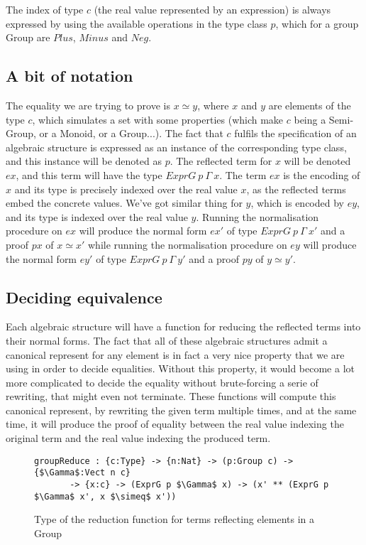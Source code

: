 The index of type $c$ (the real value represented by an expression) is always expressed by using the available operations in the type class $p$, which for a group Group are $Plus$, $Minus$ and $Neg$.

	\subsection {A bit of notation}
The equality we are trying to prove is $x \simeq y$, where $x$ and $y$ are elements of the type $c$, which  simulates a set with some properties (which make $c$ being a Semi-Group, or a Monoid, or a Group...). The fact that $c$ fulfils the specification of an algebraic structure is expressed as an instance of the corresponding type class, and this instance will be denoted as $p$.
The reflected term for $x$ will be denoted $ex$, and this term will have the type $ExprG\ p\ \Gamma\ x$. The term $ex$ is the encoding of $x$ and its type is precisely indexed over the real value $x$, as the reflected terms embed the concrete values.
We've got similar thing for $y$, which is encoded by $ey$, and its type is indexed over the real value $y$.
Running the normalisation procedure on $ex$ will produce the normal form $ex'$ of type $ExprG\ p\ \Gamma\ x'$ and a proof $px$ of $x \simeq x'$ while running the normalisation procedure on $ey$ will produce the normal form $ey'$ of type $ExprG\ p\ \Gamma\ y'$ and a proof $py$ of $y \simeq y'$.

	\subsection {Deciding equivalence}
	
Each algebraic structure will have a function for reducing the reflected terms into their normal forms. The fact that all of these algebraic structures admit a canonical represent for any element is in fact a very nice property that we are using in order to decide equalities. Without this property, it would become a lot more complicated to decide the equality without brute-forcing a serie of rewriting, that might even not terminate.
These functions will compute this canonical represent, by rewriting the given term multiple times, and at the same time, it will produce the proof of equality between the real value indexing the original term and the real value indexing the produced term.

\begin{figure}[H]
\figrule
\begin{center}
\begin{lstlisting}
groupReduce : {c:Type} -> {n:Nat} -> (p:Group c) -> {$\Gamma$:Vect n c} 
	   -> {x:c} -> (ExprG p $\Gamma$ x) -> (x' ** (ExprG p $\Gamma$ x', x $\simeq$ x'))
\end{lstlisting}
\end{center}
\caption{Type of the reduction function for terms reflecting elements in a Group}
\figrule
\end{figure}

